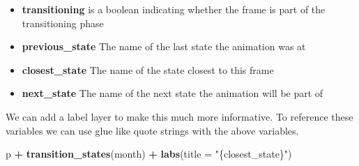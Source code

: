 \documentclass[
]{book}
\newenvironment{Shaded}{\begin{snugshade}}{\end{snugshade}}
\newcommand{\DataTypeTok}[1]{\textcolor[rgb]{0.13,0.29,0.53}{#1}}
\newcommand{\KeywordTok}[1]{\textcolor[rgb]{0.13,0.29,0.53}{\textbf{#1}}}
\newcommand{\NormalTok}[1]{#1}
\newcommand{\OperatorTok}[1]{\textcolor[rgb]{0.81,0.36,0.00}{\textbf{#1}}}
\newcommand{\StringTok}[1]{\textcolor[rgb]{0.31,0.60,0.02}{#1}}
\providecommand{\tightlist}{%
  \setlength{\itemsep}{0pt}\setlength{\parskip}{0pt}}
\begin{document}
\begin{itemize}
\tightlist
\item
  \textbf{transitioning} is a boolean indicating whether the frame is part of the transitioning phase
\item
  \textbf{previous\_state} The name of the last state the animation was at
\item
  \textbf{closest\_state} The name of the state closest to this frame
\item
  \textbf{next\_state} The name of the next state the animation will be part of
\end{itemize}

We can add a label layer to make this much more informative. To reference these variables we can use glue like quote strings with the above variables.

\begin{Shaded}
\begin{Highlighting}[]
\NormalTok{p }\OperatorTok{+}\StringTok{ }
\StringTok{  }\KeywordTok{transition\_states}\NormalTok{(month)  }\OperatorTok{+}
\StringTok{  }\KeywordTok{labs}\NormalTok{(}\DataTypeTok{title =} \StringTok{"\{closest\_state\}"}\NormalTok{)}
\end{Highlighting}
\end{Shaded}
\end{document}
